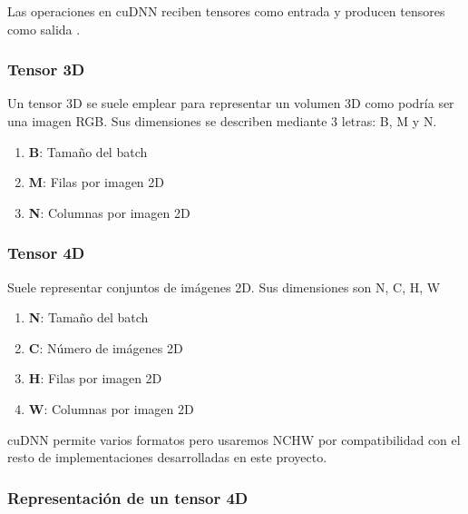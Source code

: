 Las operaciones en cuDNN reciben tensores como entrada y producen tensores como salida \cite{cuDNN_core_concepts}.

\subsubsection{Tensor 3D}
Un tensor 3D se suele emplear para representar un volumen 3D como podría ser una imagen RGB. Sus dimensiones se describen mediante 3 letras: B, M y N.

\begin{enumerate}
	\item \textbf{B}: Tamaño del batch
	\item \textbf{M}: Filas por imagen 2D
	\item \textbf{N}: Columnas por imagen 2D
\end{enumerate}

\subsubsection{Tensor 4D}
Suele representar conjuntos de imágenes 2D. Sus dimensiones son N, C, H, W

\begin{enumerate}
	\item \textbf{N}: Tamaño del batch
	\item \textbf{C}: Número de imágenes 2D
	\item \textbf{H}: Filas por imagen 2D
	\item \textbf{W}: Columnas por imagen 2D
\end{enumerate}

cuDNN permite varios formatos pero usaremos NCHW por compatibilidad con el resto de implementaciones desarrolladas en este proyecto.


\subsubsection{Representación de un tensor 4D}

